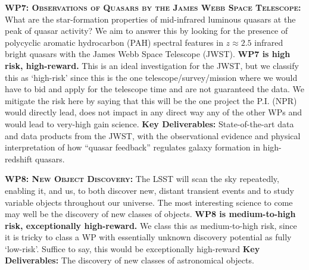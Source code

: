 \documentclass[oneside, a4paper, onecolumn, 11pt]{article}
\begin{document}
\smallskip
\smallskip
\noindent
\textbf{\textsc{WP7: Observations of Quasars by the James Webb Space Telescope:}} 
What are the star-formation properties of mid-infrared luminous quasars at the peak of quasar activity? 
We aim to answer this by looking for the presence of polycyclic aromatic hydrocarbon (PAH) spectral features 
in $z \approx 2.5$ infrared bright quasars with the James Webb Space Telescope (JWST). 
{\bf WP7 is high risk, high-reward.}
This is an ideal investigation for the JWST, but we classify this as
`high-risk' since this is the one telescope/survey/mission where we
would have to bid and apply for the telescope time and are not guaranteed
the data. We mitigate the risk here by saying that this will be the
one project the P.I. (NPR) would directly lead, does not impact in any direct way any of
the other WPs and would lead to very-high gain science.
{\bf Key Deliverables:} State-of-the-art data and data products from the JWST, with the observational evidence and physical interpretation of how ``quasar feedback'' regulates galaxy formation in high-redshift quasars. 


\smallskip
\smallskip
\noindent
\textbf{\textsc{WP8: New Object Discovery:}} 
The LSST will scan the sky repeatedly, enabling it, and us, to both
discover new, distant transient events and to study variable objects
throughout our universe. The most interesting science to come may well
be the discovery of new classes of objects.
{\bf WP8 is medium-to-high risk, exceptionally high-reward.}
We class this as medium-to-high risk, since it is tricky to class a WP
with essentially unknown discovery potential as fully `low-risk'.
Suffice to say, this would be exceptionally high-reward
{\bf Key Deliverables:} The discovery of new classes of astronomical objects. 
\end{document}
